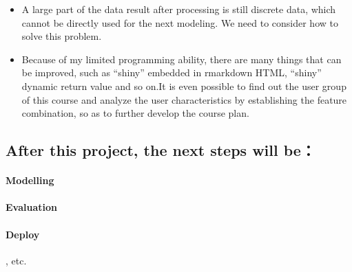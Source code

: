 \documentclass[]{article}
\providecommand{\tightlist}{%
  \setlength{\itemsep}{0pt}\setlength{\parskip}{0pt}}
\let\oldparagraph\paragraph
\renewcommand{\paragraph}[1]{\oldparagraph{#1}\mbox{}}
\begin{document}
\begin{itemize}
\tightlist
\item
  A large part of the data result after processing is still discrete
  data, which cannot be directly used for the next modeling. We need to
  consider how to solve this problem.
\item
  Because of my limited programming ability, there are many things that
  can be improved, such as ``shiny'' embedded in rmarkdown HTML,
  ``shiny'' dynamic return value and so on.It is even possible to find
  out the user group of this course and analyze the user characteristics
  by establishing the feature combination, so as to further develop the
  course plan.
\end{itemize}

\hypertarget{after-this-project-the-next-steps-will-be}{%
\subsection{After this project, the next steps will
be：}\label{after-this-project-the-next-steps-will-be}}

\hypertarget{modelling}{%
\paragraph{\texorpdfstring{Modelling }{Modelling  }}\label{modelling}}

\hypertarget{evaluation}{%
\paragraph{\texorpdfstring{Evaluation
}{Evaluation  }}\label{evaluation}}

\hypertarget{deploy}{%
\paragraph{\texorpdfstring{Deploy }{Deploy  }}\label{deploy}}

, etc.
\end{document}
